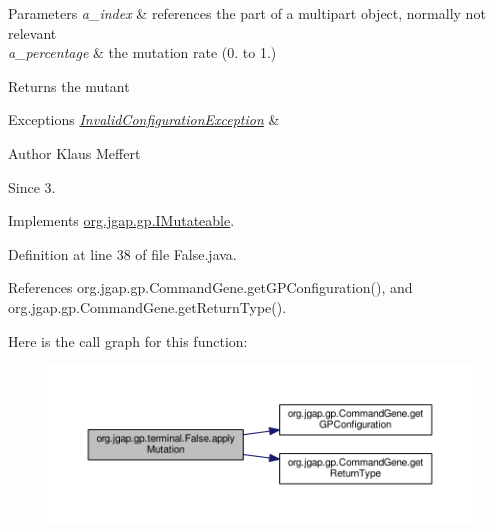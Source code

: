 \begin{DoxyParams}{Parameters}
{\em a\-\_\-index} & references the part of a multipart object, normally not relevant \\
\hline
{\em a\-\_\-percentage} & the mutation rate (0. to 1.) \\
\hline
\end{DoxyParams}
\begin{DoxyReturn}{Returns}
the mutant 
\end{DoxyReturn}

\begin{DoxyExceptions}{Exceptions}
{\em \hyperlink{classorg_1_1jgap_1_1_invalid_configuration_exception}{Invalid\-Configuration\-Exception}} & \\
\hline
\end{DoxyExceptions}
\begin{DoxyAuthor}{Author}
Klaus Meffert 
\end{DoxyAuthor}
\begin{DoxySince}{Since}
3. 
\end{DoxySince}


Implements \hyperlink{interfaceorg_1_1jgap_1_1gp_1_1_i_mutateable_abe553182ae983c2092495c889eecb2e2}{org.\-jgap.\-gp.\-I\-Mutateable}.



Definition at line 38 of file False.\-java.



References org.\-jgap.\-gp.\-Command\-Gene.\-get\-G\-P\-Configuration(), and org.\-jgap.\-gp.\-Command\-Gene.\-get\-Return\-Type().



Here is the call graph for this function\-:
\nopagebreak
\begin{figure}[H]
\begin{center}
\leavevmode
\includegraphics[width=350pt]{classorg_1_1jgap_1_1gp_1_1terminal_1_1_false_a77eae169a5f78f191f1a6cf5319eb884_cgraph}
\end{center}
\end{figure}


